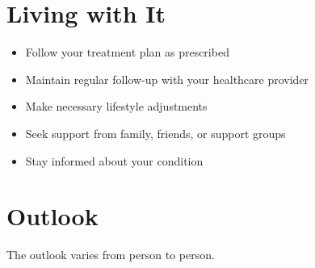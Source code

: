 \section{Living with It}
\begin{itemize}[noitemsep]
  \item Follow your treatment plan as prescribed
  \item Maintain regular follow-up with your healthcare provider
  \item Make necessary lifestyle adjustments
  \item Seek support from family, friends, or support groups
  \item Stay informed about your condition
\end{itemize}
\section{Outlook}
The outlook varies from person to person.
